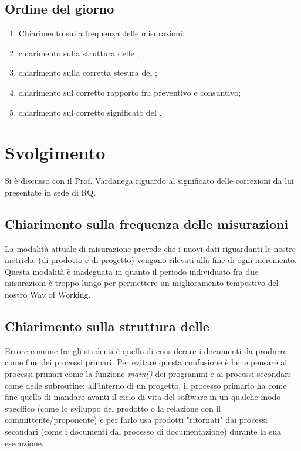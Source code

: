 \documentclass[]{article}
\begin{document}
	\subsection{Ordine del giorno}
	\begin{enumerate}
		\item Chiarimento sulla frequenza delle misurazioni;
        \item chiarimento sulla struttura delle ;
        \item chiarimento sulla corretta stesura del ;
        \item chiarimento sul corretto rapporto fra preventivo e consuntivo;
        \item chiarimento sul corretto significato del .
	\end{enumerate}
	\newpage
	\section{Svolgimento}
    Si è discusso con il Prof. Vardanega riguardo al significato delle correzioni da lui presentate in sede di RQ.

	   \subsection{Chiarimento sulla frequenza delle misurazioni}
       La modalità attuale di misurazione prevede che i nuovi dati riguardanti le nostre metriche (di prodotto e di progetto) vengano rilevati alla fine di ogni incremento. Questa modalità è inadeguata in quanto il periodo individuato fra due misurazioni è troppo lungo per permettere un miglioramento tempestivo del nostro Way of Working.

       \subsection{Chiarimento sulla struttura delle }
       Errore comune fra gli studenti è quello di considerare i documenti da produrre come fine dei processi primari. Per evitare questa confusione è bene pensare ai processi primari come la funzione \textit{main()} dei programmi e ai processi secondari come delle subroutine: all'interno di un progetto, il processo primario ha come fine quello di mandare avanti il ciclo di vita del software in un qualche modo specifico (come lo sviluppo del prodotto o la relazione con il committente/proponente) e per farlo usa prodotti "ritornati" dai processi secondari (come i documenti dal processo di documentazione) durante la sua esecuzione.
\end{document}
